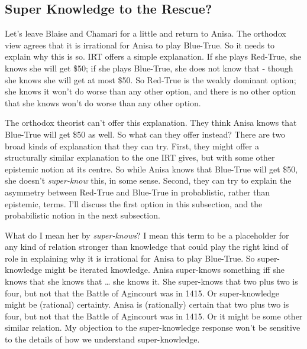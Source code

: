 \documentclass[
  10pt,
  letterpaper,
  twoside]{scrbook}
\begin{document}
\subsection{Super Knowledge to the Rescue?}\label{sec-superknow}

Let's leave Blaise and Chamari for a little and return to Anisa. The
orthodox view agrees that it is irrational for Anisa to play Blue-True.
So it needs to explain why this is so. IRT offers a simple explanation.
If she plays Red-True, she knows she will get \$50; if she plays
Blue-True, she does not know that - though she knows she will get at
most \$50. So Red-True is the weakly dominant option; she knows it won't
do worse than any other option, and there is no other option that she
knows won't do worse than any other option.

The orthodox theorist can't offer this explanation. They think Anisa
knows that Blue-True will get \$50 as well. So what can they offer
instead? There are two broad kinds of explanation that they can try.
First, they might offer a structurally similar explanation to the one
IRT gives, but with some other epistemic notion at its centre. So while
Anisa knows that Blue-True will get \$50, she doesn't \emph{super-know}
this, in some sense. Second, they can try to explain the asymmetry
between Red-True and Blue-True in probablistic, rather than epistemic,
terms. I'll discuss the first option in this subsection, and the
probabilistic notion in the next subsection.

What do I mean her by \emph{super-knows}? I mean this term to be a
placeholder for any kind of relation stronger than knowledge that could
play the right kind of role in explaining why it is irrational for Anisa
to play Blue-True. So super-knowledge might be iterated knowledge. Anisa
super-knows something iff she knows that she knows that \ldots{} she
knows it. She super-knows that two plus two is four, but not that the
Battle of Agincourt was in 1415. Or super-knowledge might be (rational)
certainty. Anisa is (rationally) certain that two plus two is four, but
not that the Battle of Agincourt was in 1415. Or it might be some other
similar relation. My objection to the super-knowledge response won't be
sensitive to the details of how we understand super-knowledge.
\end{document}

